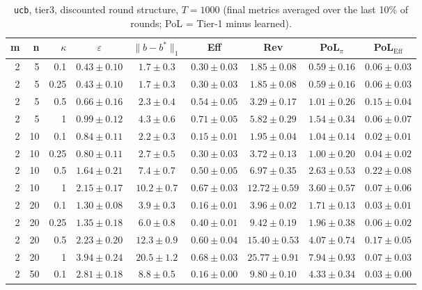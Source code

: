 \begin{table}[htbp]
\centering
\scriptsize
\caption{\texttt{ucb}, tier3, discounted round structure, $T=1000$ (final metrics averaged over the last 10\% of rounds; PoL = Tier-1 minus learned).}
\label{tab:tier3_ucb_discounted}
\begin{tabular}{@{}rrrcccccc@{}}
\toprule
m & n & $\kappa$ & $\varepsilon$ & $\|b-b^*\|_1$ & Eff & Rev & PoL$_\pi$ & PoL$_\mathrm{Eff}$ \\
\midrule
2 & 5 & 0.1 & $0.43 \pm 0.10$ & $1.7 \pm 0.3$ & $0.30 \pm 0.03$ & $1.85 \pm 0.08$ & $0.59 \pm 0.16$ & $0.06 \pm 0.03$ \\
2 & 5 & 0.25 & $0.43 \pm 0.10$ & $1.7 \pm 0.3$ & $0.30 \pm 0.03$ & $1.85 \pm 0.08$ & $0.59 \pm 0.16$ & $0.06 \pm 0.03$ \\
2 & 5 & 0.5 & $0.66 \pm 0.16$ & $2.3 \pm 0.4$ & $0.54 \pm 0.05$ & $3.29 \pm 0.17$ & $1.01 \pm 0.26$ & $0.15 \pm 0.04$ \\
2 & 5 & 1 & $0.99 \pm 0.12$ & $4.3 \pm 0.6$ & $0.71 \pm 0.05$ & $5.82 \pm 0.29$ & $1.54 \pm 0.34$ & $0.06 \pm 0.07$ \\
2 & 10 & 0.1 & $0.84 \pm 0.11$ & $2.2 \pm 0.3$ & $0.15 \pm 0.01$ & $1.95 \pm 0.04$ & $1.04 \pm 0.14$ & $0.02 \pm 0.01$ \\
2 & 10 & 0.25 & $0.80 \pm 0.11$ & $2.7 \pm 0.5$ & $0.30 \pm 0.03$ & $3.72 \pm 0.13$ & $1.00 \pm 0.20$ & $0.04 \pm 0.02$ \\
2 & 10 & 0.5 & $1.64 \pm 0.21$ & $7.4 \pm 0.7$ & $0.50 \pm 0.05$ & $6.97 \pm 0.35$ & $2.63 \pm 0.53$ & $0.22 \pm 0.08$ \\
2 & 10 & 1 & $2.15 \pm 0.17$ & $10.2 \pm 0.7$ & $0.67 \pm 0.03$ & $12.72 \pm 0.59$ & $3.60 \pm 0.57$ & $0.07 \pm 0.06$ \\
2 & 20 & 0.1 & $1.30 \pm 0.08$ & $3.9 \pm 0.3$ & $0.16 \pm 0.01$ & $3.96 \pm 0.02$ & $1.71 \pm 0.13$ & $0.03 \pm 0.01$ \\
2 & 20 & 0.25 & $1.35 \pm 0.18$ & $6.0 \pm 0.8$ & $0.40 \pm 0.01$ & $9.42 \pm 0.19$ & $1.96 \pm 0.38$ & $0.06 \pm 0.02$ \\
2 & 20 & 0.5 & $2.23 \pm 0.20$ & $12.3 \pm 0.9$ & $0.60 \pm 0.04$ & $15.40 \pm 0.53$ & $4.07 \pm 0.74$ & $0.17 \pm 0.05$ \\
2 & 20 & 1 & $3.94 \pm 0.24$ & $20.5 \pm 1.2$ & $0.68 \pm 0.03$ & $25.77 \pm 0.91$ & $7.94 \pm 0.93$ & $0.07 \pm 0.03$ \\
2 & 50 & 0.1 & $2.81 \pm 0.18$ & $8.8 \pm 0.5$ & $0.16 \pm 0.00$ & $9.80 \pm 0.10$ & $4.33 \pm 0.34$ & $0.03 \pm 0.00$ \\

\end{tabular}
\end{table}
